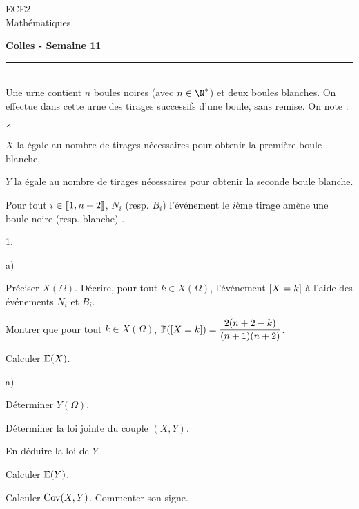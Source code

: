 \documentclass[11pt]{article}%
\begin{document}
\begin{flushleft}
ECE2 \\
Mathématiques
\end{flushleft}

\begin{center}
\textbf{\Large{Colles - Semaine 11}}
\end{center}

\hrule

\vspace*{0,2cm}

\begin{exercice}~\\
Une urne contient $n$ boules noires (avec $n\in\N^*$) et deux boules 
blanches. On effectue dans cette urne des tirages successifs d'une 
boule, sans remise. On note :
\begin{noliste}{$\scriptstyle \times$}
\item $X$ la \var égale au nombre de tirages nécessaires pour 
obtenir la première boule blanche.

\item $Y$ la \var égale au nombre de tirages nécessaires pour 
obtenir la seconde boule blanche.

\item Pour tout $i\in \llbracket 1,n+2\rrbracket$, $N_i$ (resp. $B_i$) 
l'événement \og le $i$ème tirage amène une boule noire (resp. blanche) 
\fg{}.
\end{noliste}
\begin{noliste}{1.}
\item \begin{noliste}{a)}
	\item Préciser $X(\Omega)$. Décrire, pour tout $k\in 
X(\Omega)$, l'événement $\left[ {X=k} \right]$ à l'aide des événements $N_i$ et 
$B_i$.
	\item Montrer que pour tout $k\in X(\Omega)$, $ 
\mathbb{P}(\left[ {X=k} \right])=\dfrac{2(n+2-k)}{(n+1)(n+2)}$.
	\item Calculer $\mathbb{E}(X)$.
	\end{noliste}
\item \begin{noliste}{a)}
	\item Déterminer $Y(\Omega)$.
	\item Déterminer la loi jointe du couple $(X,Y)$.
	\item En déduire la loi de $Y$.
	\item Calculer $\mathbb{E}(Y)$.
	\end{noliste}
\item Calculer $\operatorname{Cov}(X,Y)$. Commenter son signe.
\end{noliste}
\end{exercice}
\end{document}
